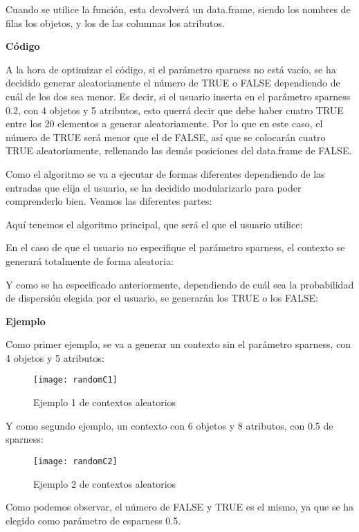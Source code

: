     Cuando se utilice la funci\'on, esta devolver\'a un data.frame, siendo los nombres de filas los objetos, y los de las columnas 
    los atributos.


    \bigskip

    \textbf{C\'odigo}

    A la hora de optimizar el c\'odigo, si el par\'ametro sparness no est\'a vac\'io, se ha decidido generar aleatoriamente el n\'umero de 
    TRUE o FALSE dependiendo de cu\'al de los dos sea menor. Es decir, si el usuario inserta en el par\'ametro sparness 0.2, con 4 objetos 
    y 5 atributos, esto querr\'a decir que debe haber cuatro TRUE entre los 20 elementos a generar aleatoriamente. Por lo que en este caso, 
    el n\'umero de TRUE ser\'a menor que el de FALSE, as\'i que se colocar\'an cuatro TRUE aleatoriamente, rellenando las dem\'as posiciones 
    del data.frame de FALSE.

    Como el algoritmo se va a ejecutar de formas diferentes dependiendo de las entradas que elija el usuario, se ha decidido modularizarlo 
    para poder comprenderlo bien. Veamos las diferentes partes:


    Aqu\'i tenemos el algoritmo principal, que ser\'a el que el usuario utilice:

    
    \bigskip

    En el caso de que el usuario no especifique el par\'ametro sparness, el contexto se generar\'a totalmente de forma aleatoria:

    
    \clearpage

    Y como se ha especificado anteriormente, dependiendo de cu\'al sea la probabilidad de dispersi\'on elegida por el usuario, se generar\'an 
    los TRUE o los FALSE:

    
    \bigskip
    
    \bigskip

    \textbf{Ejemplo}

    Como primer ejemplo, se va a generar un contexto sin el par\'ametro sparness, con 4 objetos y 5 atributos:

    \begin{figure}[H]
        \centering
        \texttt{[image: randomC1]}
        \caption{Ejemplo 1 de contextos aleatorios}
        \label{fig:randomC1}
    \end{figure}

    \bigskip
    Y como segundo ejemplo, un contexto con 6 objetos y 8 atributos, con 0.5 de sparness:

    \begin{figure}[H]
        \centering
        \texttt{[image: randomC2]}
        \caption{Ejemplo 2 de contextos aleatorios}
        \label{fig:randomC2}
    \end{figure}

    Como podemos observar, el n\'umero de FALSE y TRUE es el mismo, ya que se ha elegido como par\'ametro de esparness 0.5.
    